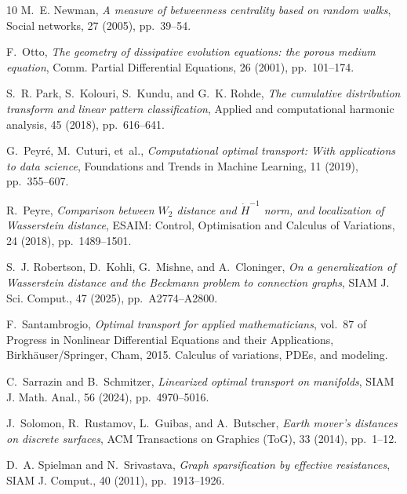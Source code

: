\documentclass[11pt,a4paper]{article}
\begin{document}
\begin{thebibliography}{10}
    {\sc M.~E. Newman}, {\em A measure of betweenness centrality based on random walks}, Social networks, 27 (2005), pp.~39--54.

    {\sc F.~Otto}, {\em The geometry of dissipative evolution equations: the porous medium equation}, Comm. Partial Differential Equations, 26 (2001), pp.~101--174.

    {\sc S.~R. Park, S.~Kolouri, S.~Kundu, and G.~K. Rohde}, {\em The cumulative distribution transform and linear pattern classification}, Applied and computational harmonic analysis, 45 (2018), pp.~616--641.

    {\sc G.~Peyr{\'e}, M.~Cuturi, et~al.}, {\em Computational optimal transport: With applications to data science}, Foundations and Trends{\textregistered} in Machine Learning, 11 (2019), pp.~355--607.

    {\sc R.~Peyre}, {\em Comparison between ${W}_2$ distance and $\dot{H}^{-1}$ norm, and localization of {W}asserstein distance}, ESAIM: Control, Optimisation and Calculus of Variations, 24 (2018), pp.~1489--1501.

    {\sc S.~J. Robertson, D.~Kohli, G.~Mishne, and A.~Cloninger}, {\em On a generalization of {W}asserstein distance and the {B}eckmann problem to connection graphs}, SIAM J. Sci. Comput., 47 (2025), pp.~A2774--A2800.

    {\sc F.~Santambrogio}, {\em Optimal transport for applied mathematicians}, vol.~87 of Progress in Nonlinear Differential Equations and their Applications, Birkh\"auser/Springer, Cham, 2015.
    \newblock Calculus of variations, PDEs, and modeling.

    {\sc C.~Sarrazin and B.~Schmitzer}, {\em Linearized optimal transport on manifolds}, SIAM J. Math. Anal., 56 (2024), pp.~4970--5016.

    {\sc J.~Solomon, R.~Rustamov, L.~Guibas, and A.~Butscher}, {\em Earth mover's distances on discrete surfaces}, ACM Transactions on Graphics (ToG), 33 (2014), pp.~1--12.

    {\sc D.~A. Spielman and N.~Srivastava}, {\em Graph sparsification by effective resistances}, SIAM J. Comput., 40 (2011), pp.~1913--1926.


\end{thebibliography}
\end{document}
